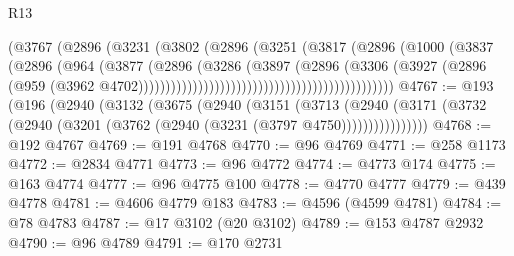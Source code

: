 \begin{lexlean}{R13}
\begin{coremodule}
                                                      (@3767
                                                        (@2896
                                                          (@3231
                                                            (@3802
                                                              (@2896
                                                                (@3251
                                                                  (@3817
                                                                    (@2896
                                                                      (@1000
                                                                        (@3837
                                                                          (@2896
                                                                            (@964
                                                                              (@3877
                                                                                (@2896
                                                                                  (@3286
                                                                                    (@3897
                                                                                      (@2896
                                                                                        (@3306
                                                                                          (@3927
                                                                                            (@2896
                                                                                              (@959
                                                                                                (@3962
                                                                                                  @4702)))))))))))))))))))))))))))))))))))))))))))))))
@4767 := @193
    (@196
      (@2940
        (@3132
          (@3675
            (@2940
              (@3151
                (@3713
                  (@2940
                    (@3171 (@3732 (@2940 (@3201 (@3762 (@2940 (@3231 (@3797 @4750))))))))))))))))
@4768 := @192 @4767
@4769 := @191 @4768
@4770 := @96 @4769
@4771 := @258 @1173
@4772 := @2834 @4771
@4773 := @96 @4772
@4774 := @4773 @174
@4775 := @163 @4774
@4777 := @96 @4775 @100
@4778 := @4770 @4777
@4779 := @439 @4778
@4781 := @4606 @4779 @183
@4783 := @4596 (@4599 @4781)
@4784 := @78 @4783
@4787 := @17 @3102 (@20 @3102)
@4789 := @153 @4787 @2932
@4790 := @96 @4789
@4791 := @170 @2731

\end{coremodule}
\end{lexlean}

